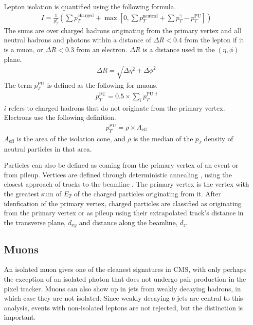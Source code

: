 Lepton isolation is quantified using the following formula.
\begin{gather}
  I = \frac{1}{p_T^\ell} \left(\sum p_T^\mathrm{charged} +
      \max\left[0, \sum p_T^\mathrm{neutral} +
               \sum p_T^\mathrm{\gamma} - p_T^\mathrm{PU}
               \right]\right) \label{eq:isolation}
\end{gather}
The sums are over charged hadrons originating from the primary vertex
and all neutral hadrons and photons within a distance of $\Delta R < 0.4$
from the lepton if it is a muon, or $\Delta R < 0.3$ from an electron.
$\Delta R$ is a distance used in the $(\eta, \phi)$ plane.
\begin{gather}
  \Delta R = \sqrt{\Delta\eta^2 + \Delta\phi^2}
\end{gather}
The term $p_T^\mathrm{PU}$ is defined as the following for muons.
\begin{gather}
  p_T^\mathrm{PU} = 0.5 \times \sum_i p_T^{\mathrm{PU},i}
\end{gather}
$i$ refers to charged hadrons that do not originate from the primary vertex.
Electrons use the following definition.
\begin{gather}
  p_T^\mathrm{PU} = \rho \times A_\mathrm{eff}
\end{gather}
$A_\mathrm{eff}$ is the area of the isolation cone,
and $\rho$ is the median of the $p_T$ density of neutral particles in that area.

Particles can also be defined as coming from the primary vertex of an event or from pileup.
Vertices are defined through deterministic annealing \cite{726788},
using the closest approach of tracks to the beamline \cite{Collaboration_2014}.
The primary vertex is the vertex with
the greatest sum of $E_T$ of the charged particles originating from it.
After idenfication of the primary vertex,
charged particles are classified as originating from the primary vertex or as pileup
using their extrapolated track's distance in the transverse plane, $d_{xy}$
and distance along the beamline, $d_z$.

\subsection{Muons}

An isolated muon gives one of the cleanest signatures in CMS,
with only perhaps the exception of an isolated photon that does not
undergo pair production in the pixel tracker.
Muons can also show up in jets from weakly decaying hadrons,
in which case they are not isolated.
Since weakly decaying $b$ jets are central to this analysis,
events with non-isolated leptons are not rejected,
but the distinction is important.

